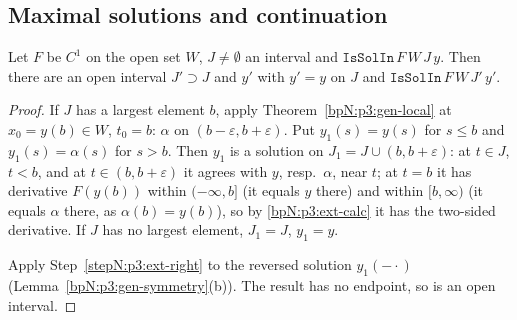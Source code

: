 \subsection{Maximal solutions and continuation}\label{bpN:p3:s-max}

\begin{lemma}\label{bpN:p3:gen-extend}
Let $F$ be $C^1$ on the open set $W$, $J\ne\emptyset$ an interval and $\texttt{IsSolIn}\,F\,W\,J\,y$. Then there are an
open interval $J'\supset J$ and $y'$ with $y'=y$ on $J$ and $\texttt{IsSolIn}\,F\,W\,J'\,y'$.
\end{lemma}
\begin{proof}
\label{stepN:p3:ext-right} If $J$ has a largest element $b$, apply Theorem~\ref{bpN:p3:gen-local} at $x_0=y(b)\in W$, $t_0=b$: $\alpha$ on $(b-\varepsilon,b+\varepsilon)$.
Put $y_1(s)=y(s)$ for $s\le b$ and $y_1(s)=\alpha(s)$ for $s>b$. Then $y_1$ is a solution on $J_1=J\cup(b,b+\varepsilon)$: at $t\in J$, $t<b$, and at $t\in(b,b+\varepsilon)$ it agrees with $y$, resp.\ $\alpha$, near $t$;
at $t=b$ it has derivative $F(y(b))$ within $(-\infty,b]$ (it equals $y$ there) and within $[b,\infty)$ (it equals $\alpha$ there, as $\alpha(b)=y(b)$), so by \ref{bpN:p3:ext-calc} it has the two-sided derivative.
If $J$ has no largest element, $J_1=J$, $y_1=y$.

\label{stepN:p3:ext-left} Apply Step~\ref{stepN:p3:ext-right} to the reversed solution $y_1(-\cdot)$ (Lemma~\ref{bpN:p3:gen-symmetry}(b)). The result has no endpoint, so is an open interval.
\end{proof}

